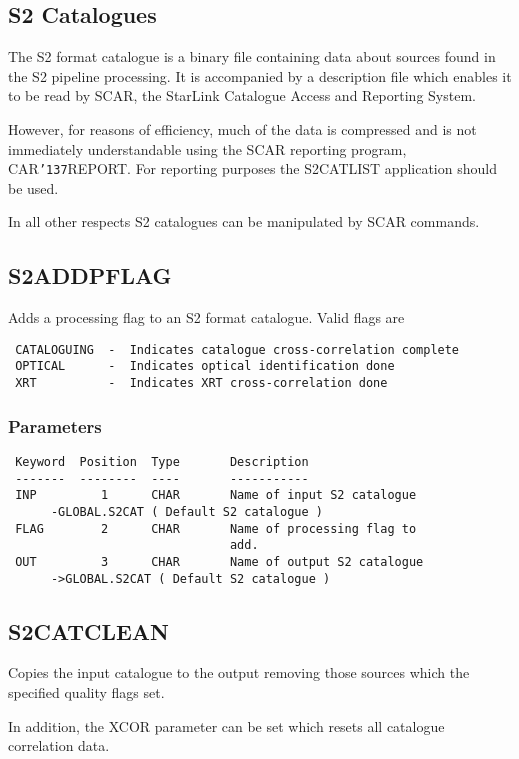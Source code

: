 \documentclass{book}
\renewcommand{\_}{{\tt\char'137}}     %
\begin{document}
\subsection{S2 Catalogues}
The S2 format catalogue is a binary file containing data about sources
found in the S2 pipeline processing. It is accompanied by a description
file which enables it to be read by SCAR, the StarLink Catalogue Access
and Reporting System.
 
However, for reasons of efficiency, much of the data is compressed and
is not immediately understandable using the SCAR reporting program,
CAR\_REPORT. For reporting purposes the S2CATLIST application should be
used.
 
In all other respects S2 catalogues can be manipulated by SCAR
commands.
 
\subsection{S2ADDPFLAG}
Adds a processing flag to an S2 format catalogue. Valid flags are
\begin{verbatim}
 CATALOGUING  -  Indicates catalogue cross-correlation complete
 OPTICAL      -  Indicates optical identification done
 XRT          -  Indicates XRT cross-correlation done
\end{verbatim}
\subsubsection{Parameters}
\begin{verbatim}
 Keyword  Position  Type       Description
 -------  --------  ----       -----------
 INP         1      CHAR       Name of input S2 catalogue
      -GLOBAL.S2CAT ( Default S2 catalogue )
 FLAG        2      CHAR       Name of processing flag to
                               add.
 OUT         3      CHAR       Name of output S2 catalogue
      ->GLOBAL.S2CAT ( Default S2 catalogue )
\end{verbatim}\subsection{S2CATCLEAN}
Copies the input catalogue to the output removing those sources
which the specified quality flags set.
 
In addition, the XCOR parameter can be set which resets all
catalogue correlation data.
 
\end{document}
